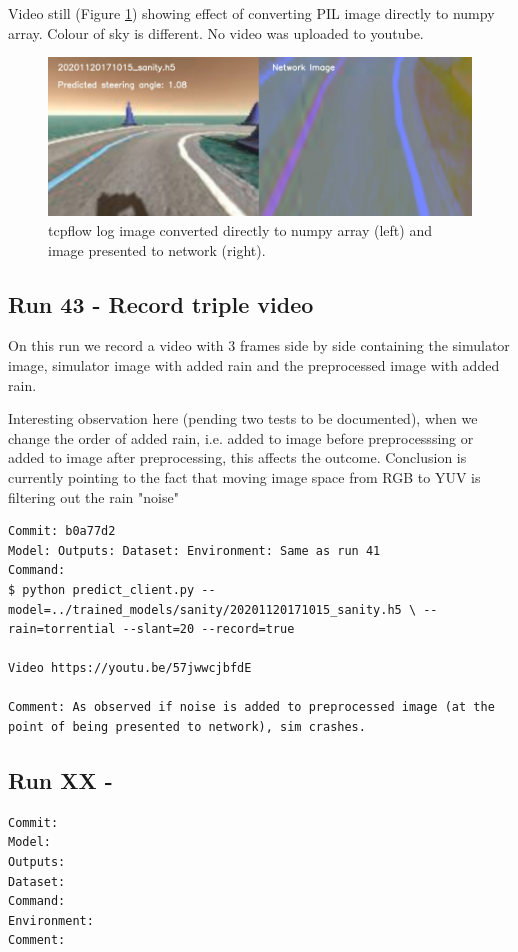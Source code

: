 Video still (Figure \ref{fig:tcpflow_Run42}) showing effect of converting PIL image directly to numpy array. Colour of sky is different.
No video was uploaded to youtube.


\begin{figure}[h!]
\centering
\includegraphics[width=\textwidth]{Figures/tcpflow_Run42.png}
\caption{tcpflow log image converted directly to numpy array (left) and image presented to network (right).}
\label{fig:tcpflow_Run42}
\end{figure}




\subsection{Run 43 - Record triple video}
On this run we record a video with 3 frames side by side containing the simulator image, simulator image with added rain and the preprocessed image with added rain.

Interesting observation here (pending two tests to be documented), when we change the order of added rain, i.e. added to image before preprocesssing or added to image after preprocessing, this affects the outcome. Conclusion is currently pointing to the fact that moving image space from RGB to YUV is filtering out the rain "noise"

\label{app_res:43}
\begin{verbatim}
Commit: b0a77d2
Model: Outputs: Dataset: Environment: Same as run 41 
Command: 
$ python predict_client.py --model=../trained_models/sanity/20201120171015_sanity.h5 \ --rain=torrential --slant=20 --record=true

Video https://youtu.be/57jwwcjbfdE

Comment: As observed if noise is added to preprocessed image (at the point of being presented to network), sim crashes.

\end{verbatim}

\subsection{Run XX - }
\begin{verbatim}
Commit: 
Model: 
Outputs: 
Dataset: 
Command: 
Environment: 
Comment: 
\end{verbatim}








